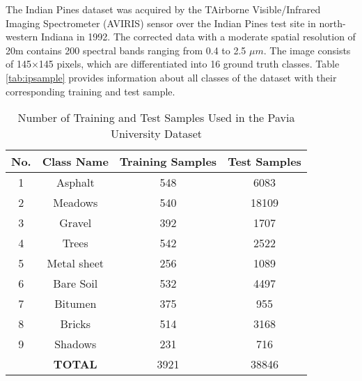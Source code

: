 \documentclass[conference]{IEEEtran}
\begin{document}
The Indian Pines dataset was acquired by the TAirborne Visible/Infrared Imaging
Spectrometer (AVIRIS) sensor over the Indian Pines test site in north-western
Indiana in 1992. The corrected data with a moderate spatial resolution of 20m
contains 200 spectral bands ranging from 0.4 to 2.5 $\mu m$. The image consists of
145$\times$145 pixels, which are differentiated into 16 ground truth classes.
Table \ref{tab:ipsample} provides information about all classes of the dataset
with their corresponding training and test sample.


\begin{table}[htbp]
    \caption{Number of Training and Test Samples Used in the Pavia University Dataset}
    \begin{center}
    \begin{tabular}{cc|cc}
    \hline
    \hline
    \textbf{No.} & \textbf{Class Name}& \textbf{Training Samples}& \textbf{Test Samples} \\
    \hline
    1 & Asphalt        &  548 &  6083 \\
    2 & Meadows        &  540 & 18109 \\
    3 & Gravel         &  392 &  1707 \\
    4 & Trees          &  542 &  2522 \\
    5 & Metal sheet    &  256 &  1089 \\
    6 & Bare Soil      &  532 &  4497 \\
    7 & Bitumen        &  375 &   955 \\
    8 & Bricks         &  514 &  3168 \\
    9 & Shadows        &  231 &   716 \\
    \hline
      & \textbf{TOTAL} & 3921 & 38846 \\
    \hline
    \hline
    \end{tabular}
    \end{center}
    \label{tab:pusample}
    \end{table}
\end{document}
